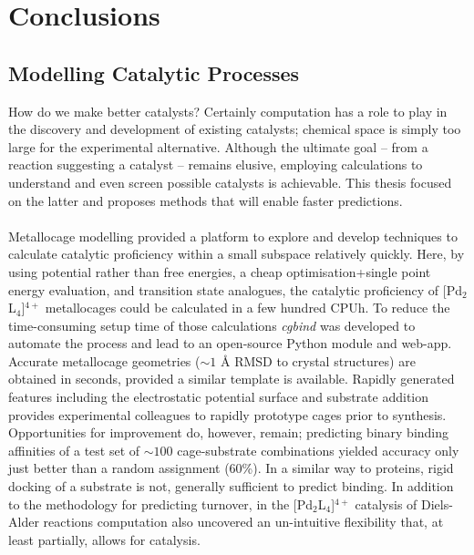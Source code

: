 \documentclass[../main.tex]{subfiles}
\begin{document}
\setcounter{footnote}{0} 


\chapter{Conclusions}

\section{Modelling Catalytic Processes}

How do we make better catalysts? Certainly computation has a role to play in the discovery and development of existing catalysts; chemical space is simply too large for the experimental alternative. Although the ultimate goal -- from a reaction suggesting a catalyst -- remains elusive, employing calculations to understand and even screen possible catalysts is achievable. This thesis focused on the latter and proposes methods that will enable faster predictions.
\\\\
Metallocage modelling provided a platform to explore and develop techniques to calculate catalytic proficiency within a small subspace relatively quickly. Here, by using potential rather than free energies, a cheap optimisation+single point energy evaluation, and transition state analogues, the catalytic proficiency of [Pd${}_2$L${}_4$]${}^{4+}$ metallocages could be calculated in a few hundred CPUh. To reduce the time-consuming setup time of those calculations \emph{cgbind} was developed to automate the process and lead to an open-source Python module and web-app. Accurate metallocage geometries ($\sim1$ \AA${}$ RMSD to crystal structures) are obtained in seconds, provided a similar template is available. Rapidly generated features including the electrostatic potential surface and substrate addition provides experimental colleagues to rapidly prototype cages prior to synthesis. Opportunities for improvement do, however, remain; predicting binary binding affinities of a test set of $\sim 100$ cage-substrate combinations yielded accuracy only just better than a random assignment (60\%). In a similar way to proteins, rigid docking of a substrate is not, generally sufficient to predict binding.\cite{Kitchen2004} In addition to the methodology for predicting turnover, in the [Pd${}_2$L${}_4$]${}^{4+}$ catalysis of Diels-Alder reactions computation also uncovered an un-intuitive flexibility that, at least partially, allows for catalysis. 
\\\\
\end{document}
